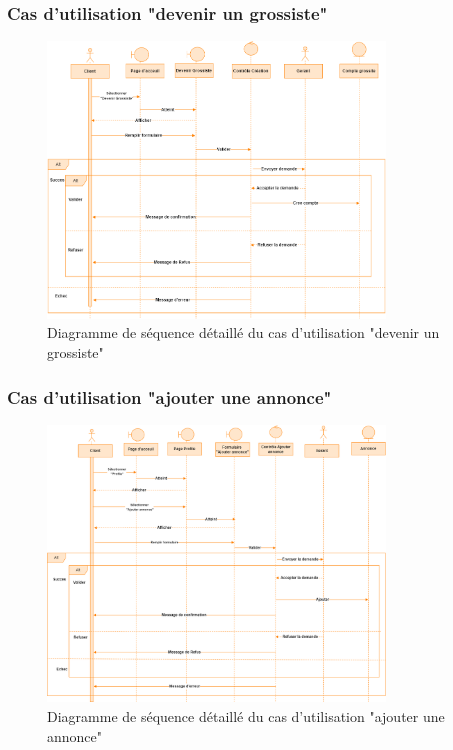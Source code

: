 \documentclass[edit,12pt,a4paper,ChapStyle,oneside,doubleinterligne]{report}
\begin{document}
\subsubsection{Cas d'utilisation "devenir un grossiste"}
\begin{figure}[H]\label{fig:Diagramme cas 2d}
\centering
\includegraphics[width=0.8\textwidth]{images/Devenir un grossiste d.png}
\caption{Diagramme de séquence détaillé du cas d'utilisation "devenir un grossiste"}
\end{figure}


\subsubsection{Cas d'utilisation "ajouter une annonce"}
\begin{figure}[H]\label{fig:Diagramme cas 3d}
\centering
\includegraphics[width=0.8\textwidth]{images/Ajouter une annonce d.png}
\caption{Diagramme de séquence détaillé du cas d'utilisation "ajouter une annonce"}
\end{figure}
\end{document}
